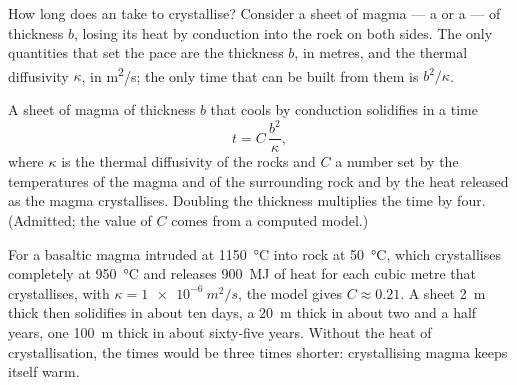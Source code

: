 How long does an  take to crystallise? Consider a sheet of
magma --- a  or a  --- of thickness $b$, losing its heat by
conduction into the rock on both sides. The only quantities that set the
pace are the thickness $b$, in metres, and the thermal diffusivity $\kappa$,
in \unit{m^2/s}; the only time that can be built from them is $b^2/\kappa$.

\begin{proposition}\label{prop:g11:igneous-rocks:cooling}
A sheet of magma of thickness $b$ that cools by conduction solidifies in a
time
\[
  t = C\,\frac{b^2}{\kappa},
\]
where $\kappa$ is the thermal diffusivity of the rocks and $C$ a number set
by the temperatures of the magma and of the surrounding rock and by the heat
released as the magma crystallises. Doubling the thickness multiplies the
time by four. (Admitted; the value of $C$ comes from a computed model.)
\end{proposition}

For a basaltic magma intruded at \qty{1150}{\degreeCelsius} into rock at
\qty{50}{\degreeCelsius}, which crystallises completely at
\qty{950}{\degreeCelsius} and releases \qty{900}{MJ} of heat for each cubic
metre that crystallises, with $\kappa = \qty{1e-6}{m^2/s}$, the model gives
$C \approx 0.21$. A sheet \qty{2}{m} thick then solidifies in about ten
days, a  \qty{20}{m} thick in about two and a half years, one
\qty{100}{m} thick in about sixty-five years. Without the heat of
crystallisation, the times would be three times shorter: crystallising
magma keeps itself warm.

